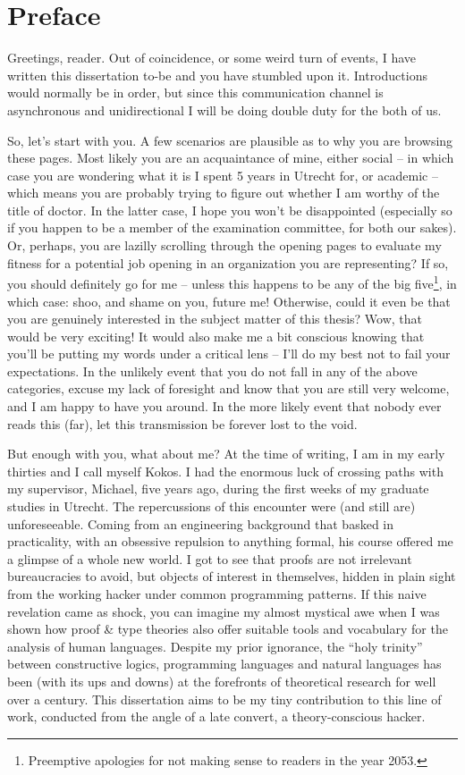 \chapter*{Preface}

Greetings, reader. Out of coincidence, or some weird turn of events, I have written this dissertation to-be and you have stumbled upon it.
Introductions would normally be in order, but since this communication channel is asynchronous and unidirectional I will be doing double duty for the both of us.

So, let's start with you. 
A few scenarios are plausible as to why you are browsing these pages. 
Most likely you are an acquaintance of mine, either social – in which case you are wondering what it is I spent 5 years in Utrecht for, or academic – which means you are probably trying to figure out whether I am worthy of the title of doctor. 
In the latter case, I hope you won’t be disappointed (especially so if you happen to be a member of the examination committee, for both our sakes).
Or, perhaps, you are lazilly scrolling through the opening pages to evaluate my fitness for a potential job opening in an organization you are representing? 
If so, you should definitely go for me – unless this happens to be any of the big five\footnote{Preemptive
apologies for not making sense to readers in the year 2053.}, in which case: shoo, and shame on you, future me!
Otherwise, could it even be that you are genuinely interested in the subject matter of this thesis? 
Wow, that would be very exciting! 
It would also make me a bit conscious knowing that you’ll be putting my words under a critical lens – I’ll do my best not to fail your expectations. 
In the unlikely event that you do not fall in any of the above categories, excuse my lack of foresight and know that you are still very welcome, and I am happy to have you around. 
In the more likely event that nobody ever reads this (far), let this transmission be forever lost to the void.

But enough with you, what about me? 
At the time of writing, I am in my early thirties and I call myself Kokos. 
I had the enormous luck of crossing paths with my supervisor, Michael, five years ago, during the first weeks of my graduate studies in Utrecht. 
The repercussions of this encounter were (and still are) unforeseeable. 
Coming from an engineering background that basked in practicality, with an obsessive repulsion to anything formal, his course offered me a glimpse of a whole new world. 
I got to see that proofs are not irrelevant bureaucracies to avoid, but objects of interest in themselves, hidden in plain sight from the working hacker under common programming patterns. 
If this naive revelation came as shock, you can imagine my almost mystical awe when I was shown how proof \& type theories also offer suitable tools and vocabulary for the analysis of human languages. 
Despite my prior ignorance, the “holy trinity” between constructive logics, programming languages and natural languages has been (with its ups and downs) at the forefronts of theoretical research for well over a century. 
This dissertation aims to be my tiny contribution to this line of work, conducted from the angle of a late convert, a theory-conscious hacker. 

